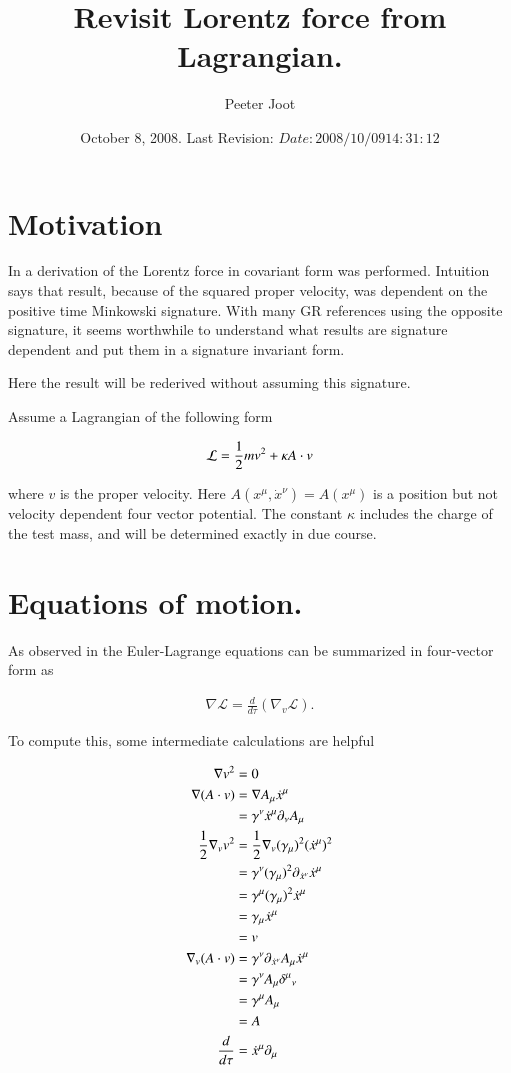 \documentclass{article}
\title{ Revisit Lorentz force from Lagrangian. }
\author{Peeter Joot}
\date{ October 8, 2008.  Last Revision: $Date: 2008/10/09 14:31:12 $ }
\newcommand{\grad}[0]{\nabla}
\newcommand{\LL}[0]{\mathcal{L}}
\newcommand{\xdot}[0]{\dot{x}}
\begin{document}
\maketitle{}
\tableofcontents
\section{ Motivation }

In \cite{PJSrLagrangian} a derivation of the Lorentz force in covariant
form was performed.  Intuition says that result, because of the squared
proper velocity, was dependent on the 
positive time Minkowski signature.
With many
GR references using the opposite signature, it seems worthwhile to understand
what results are signature dependent and put them in a signature invariant form.

Here the result will be rederived without assuming this signature.

Assume a Lagrangian of the following form

\begin{align}\label{eqn:potlag}
\LL = \inv{2}m v^2 + \kappa A \cdot v
\end{align}

where $v$ is the proper velocity.  Here $A(x^\mu,\xdot^\nu) = A(x^\mu)$ is a position but not velocity dependent four vector potential.  The constant $\kappa$ includes the charge of the test mass, and will be determined exactly in due course.

\section{ Equations of motion. }

As observed in \cite{PJCanMomentum} the Euler-Lagrange equations can be summarized in four-vector form as

\begin{align}
\grad \LL = \frac{d}{d\tau}(\grad_v \LL).
\end{align}

To compute this, some intermediate calculations are helpful

\begin{align*}
\grad v^2 &= 0 \\
\grad (A \cdot v)
&= \grad A_\mu \xdot^\mu \\
&= \gamma^\nu \xdot^\mu \partial_\nu A_\mu \\
\inv{2} \grad_v v^2 
&= \inv{2} \grad_v (\gamma_\mu)^2 (\xdot^\mu)^2 \\
&= \gamma^\nu (\gamma_\mu)^2 \partial_{\xdot^\nu} \xdot^\mu \\
&= \gamma^\mu (\gamma_\mu)^2 \xdot^\mu \\
&= \gamma_\mu \xdot^\mu \\
&= v \\
\grad_v (A \cdot v)
&= \gamma^\nu \partial_{\xdot^\nu} A_\mu \xdot^\mu \\
&= \gamma^\nu A_\mu {\delta^\mu}_\nu \\
&= \gamma^\mu A_\mu \\
&= A \\
\frac{d}{d\tau} &= \xdot^\mu \partial_\mu
\end{align*}
\end{document}
